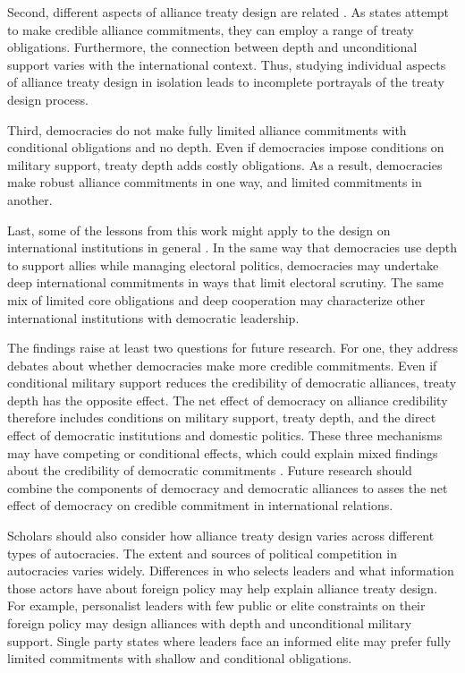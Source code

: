 \documentclass[12pt]{article}
\begin{document}
Second, different aspects of alliance treaty design are related \citep{FjelstulReiter2019}. 
As states attempt to make credible alliance commitments, they can employ a range of treaty obligations. 
Furthermore, the connection between depth and unconditional support varies with the international context. 
Thus, studying individual aspects of alliance treaty design in isolation leads to incomplete portrayals of the treaty design process. 


Third, democracies do not make fully limited alliance commitments with conditional obligations and no depth.
Even if democracies impose conditions on military support, treaty depth adds costly obligations.
As a result, democracies make robust alliance commitments in one way, and limited commitments in another. 


Last, some of the lessons from this work might apply to the design on international institutions in general \citep{DownesRocke1995, MartinSimmons1998, Koremenosetal2001, Thompson2010}.
In the same way that democracies use depth to support allies while managing electoral politics, democracies may undertake deep international commitments in ways that limit electoral scrutiny. 
The same mix of limited core obligations and deep cooperation may characterize other international institutions with democratic leadership. 


The findings raise at least two questions for future research.  
For one, they address debates about whether democracies make more credible commitments. 
Even if conditional military support reduces the credibility of democratic alliances, treaty depth has the opposite effect. 
The net effect of democracy on alliance credibility therefore includes conditions on military support, treaty depth, and the direct effect of democratic institutions and domestic politics. 
These three mechanisms may have competing or conditional effects, which could explain mixed findings about the credibility of democratic commitments \citep{Schultz1999, Leeds1999, Thyne2012, DownesSechser2012, PotterBaum2014}.
Future research should combine the components of democracy and democratic alliances to asses the net effect of democracy on credible commitment in international relations. 


Scholars should also consider how alliance treaty design varies across different types of autocracies. 
The extent and sources of political competition in autocracies varies widely. 
Differences in who selects leaders and what information those actors have about foreign policy \citep{Weeks2008} may help explain alliance treaty design.
For example, personalist leaders with few public or elite constraints on their foreign policy may design alliances with depth and unconditional military support. 
Single party states where leaders face an informed elite may prefer fully limited commitments with shallow and conditional obligations. 
\end{document}
